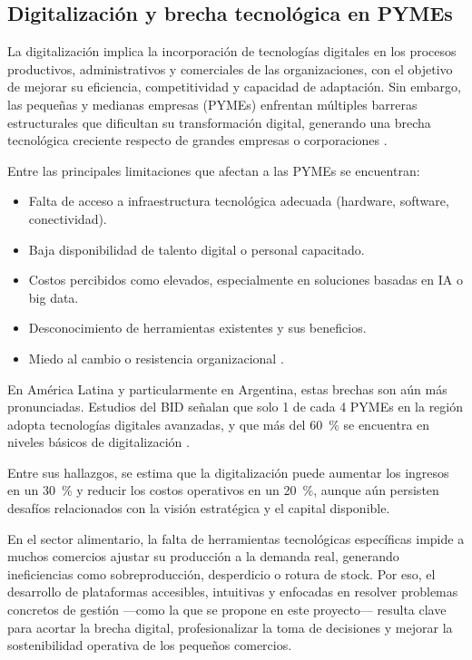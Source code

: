\subsection{Digitalización y brecha tecnológica en PYMEs}

La digitalización implica la incorporación de tecnologías digitales en los procesos productivos, administrativos y comerciales de las organizaciones, con el objetivo de mejorar su eficiencia, competitividad y capacidad de adaptación. Sin embargo, las pequeñas y medianas empresas (PYMEs) enfrentan múltiples barreras estructurales que dificultan su transformación digital, generando una brecha tecnológica creciente respecto de grandes empresas o corporaciones \parencite{oecd2021}.

Entre las principales limitaciones que afectan a las PYMEs se encuentran:

\begin{itemize}
    \item Falta de acceso a infraestructura tecnológica adecuada (hardware, software, conectividad).
    \item Baja disponibilidad de talento digital o personal capacitado.
    \item Costos percibidos como elevados, especialmente en soluciones basadas en IA o big data.
    \item Desconocimiento de herramientas existentes y sus beneficios.
    \item Miedo al cambio o resistencia organizacional \parencite{jordao2022}.
\end{itemize}

En América Latina y particularmente en Argentina, estas brechas son aún más pronunciadas. Estudios del BID señalan que solo 1 de cada 4 PYMEs en la región adopta tecnologías digitales avanzadas, y que más del 60~\% se encuentra en niveles básicos de digitalización \parencite{bid2020}.

Entre sus hallazgos, se estima que la digitalización puede aumentar los ingresos en un 30~\% y reducir los costos operativos en un 20~\%, aunque aún persisten desafíos relacionados con la visión estratégica y el capital disponible.

En el sector alimentario, la falta de herramientas tecnológicas específicas impide a muchos comercios ajustar su producción a la demanda real, generando ineficiencias como sobreproducción, desperdicio o rotura de stock. Por eso, el desarrollo de plataformas accesibles, intuitivas y enfocadas en resolver problemas concretos de gestión —como la que se propone en este proyecto— resulta clave para acortar la brecha digital, profesionalizar la toma de decisiones y mejorar la sostenibilidad operativa de los pequeños comercios.

